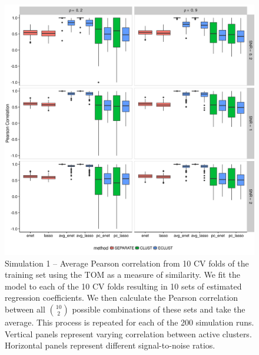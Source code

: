 \begin{appendices}
\begin{figure}[H]
	\centering
	\includegraphics[scale=0.6, keepaspectratio]{./figs/hydra/results/figures/sim1-sept10/pearson_TOM_sim1.png}
	\caption{Simulation 1 -- Average Pearson correlation from 10 CV folds of the training set using the TOM as a measure of similarity. We fit the model to each of the 10 CV folds resulting in 10 sets of estimated regression coefficients. We then calculate the Pearson correlation between all $\binom{10}{2}$ possible combinations of these sets and take the average. This process is repeated for each of the 200 simulation runs. Vertical panels represent varying correlation between active clusters. Horizontal panels represent different signal-to-noise ratios.}
	\label{fig:pearson_TOM_sim1}
\end{figure}


\end{appendices}
